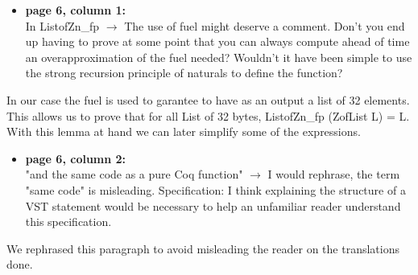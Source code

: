 \begin{itemize}
  \item \textbf{page 6, column 1:}\\
        In ListofZn\_fp $\rightarrow$ The use of fuel might deserve a comment. Don't you end up having to prove at some point that you can always compute ahead of time an overapproximation of the fuel needed? Wouldn't it have been simple to use the strong recursion principle of naturals to define the function?
\end{itemize}
\begin{answer}
  In our case the fuel is used to garantee to have as an output a list of 32 elements. This allows us to prove that for all List of 32 bytes, ListofZn\_fp (ZofList L) = L. With this lemma at hand we can later simplify some of the expressions.
\end{answer}

\begin{itemize}
  \item \textbf{page 6, column 2:}\\
        "and the same code as a pure Coq function" $\rightarrow$ I would rephrase, the term "same code" is misleading.
        Specification: I think explaining the structure of a VST statement would be necessary to help an unfamiliar reader understand this specification.
\end{itemize}
\begin{answer}
  We rephrased this paragraph to avoid misleading the reader on the translations done.\\
\end{answer}

